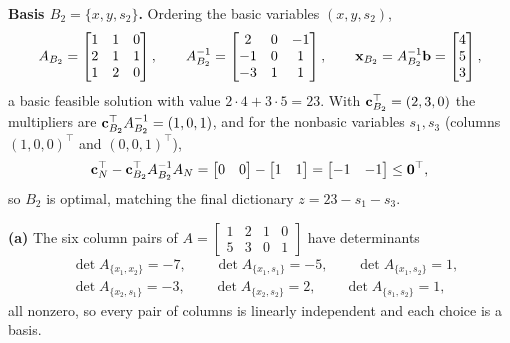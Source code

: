 \textbf{Basis $B_2 = \{x, y, s_2\}$.} Ordering the basic variables
$(x, y, s_2)$,
\[
A_{B_2} =
\begin{bmatrix}
1 & 1 & 0 \\
2 & 1 & 1 \\
1 & 2 & 0
\end{bmatrix},
\qquad
A_{B_2}^{-1} =
\begin{bmatrix}
2 & 0 & -1 \\
-1 & 0 & 1 \\
-3 & 1 & 1
\end{bmatrix},
\qquad
\mathbf{x}_{B_2} = A_{B_2}^{-1}\mathbf{b} = \begin{bmatrix} 4 \\ 5 \\ 3 \end{bmatrix},
\]
a basic feasible solution with value $2 \cdot 4 + 3 \cdot 5 = 23$. With
$\mathbf{c}_{B_2}^\top = (2, 3, 0)$ the multipliers are
$\mathbf{c}_{B_2}^\top A_{B_2}^{-1} = (1, 0, 1)$, and for the nonbasic variables
$s_1, s_3$ (columns $(1,0,0)^\top$ and $(0,0,1)^\top$),
\[
\mathbf{c}_N^\top - \mathbf{c}_{B_2}^\top A_{B_2}^{-1} A_N
= \begin{bmatrix} 0 & 0 \end{bmatrix}
- \begin{bmatrix} 1 & 1 \end{bmatrix}
= \begin{bmatrix} -1 & -1 \end{bmatrix} \leq \mathbf{0}^\top,
\]
so $B_2$ is optimal, matching the final dictionary
$z = 23 - s_1 - s_3$.


\textbf{(a)} The six column pairs of
$A = \begin{bmatrix} 1 & 2 & 1 & 0 \\ 5 & 3 & 0 & 1 \end{bmatrix}$ have
determinants
\[
\begin{aligned}
&\det A_{\{x_1,x_2\}} = -7,\qquad
\det A_{\{x_1,s_1\}} = -5,\qquad
\det A_{\{x_1,s_2\}} = 1,\\
&\det A_{\{x_2,s_1\}} = -3,\qquad
\det A_{\{x_2,s_2\}} = 2,\qquad
\det A_{\{s_1,s_2\}} = 1,
\end{aligned}
\]
all nonzero, so every pair of columns is linearly independent and each
choice is a basis.

